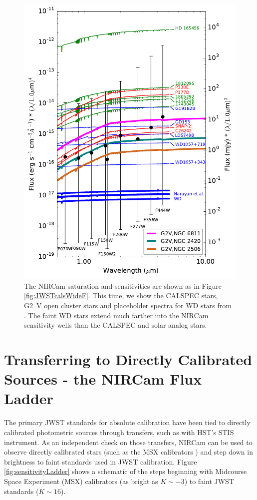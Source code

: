 \documentclass{aastex6}
\begin{document}
\begin{figure}[!hbtp]
\centering
\includegraphics[width=.49\columnwidth]{calspec_and_new_clust_wd.pdf}
\caption{The NIRCam saturation and sensitivities are shown as in Figure \ref{fig:JWSTcalsWideF}.
This time, we show the CALSPEC stars, G2~V open cluster stars and placeholder spectra for WD stars from \citet{narayan2016wdnetwork}.
The faint WD stars extend much farther into the NIRCam sensitivity wells than the CALSPEC and solar analog stars.}\label{fig:wideFiltWDCalspec}
\end{figure}


\clearpage
\section{Transferring to Directly Calibrated Sources - the NIRCam Flux Ladder}

The primary JWST standards for absolute calibration have been tied to directly calibrated photometric sources through transfers, such as with HST's STIS instrument.
As an independent check on those transfers, NIRCam can be used to observe directly calibrated stars (such as the MSX calibrators \citep{price2004msxCal}) and step down in brightness to faint standards used in JWST calibration.
Figure \ref{fig:sensitivityLadder} shows a schematic of the steps beginning with Midcourse Space Experiment (MSX) calibrators (as bright as $K \sim -3$) to faint JWST standards ($K \sim 16$).
\end{document}
